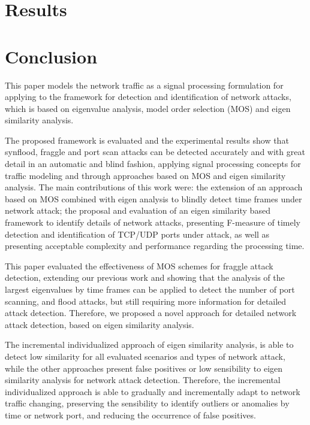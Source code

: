 \section{Results}
\label{sec:4_results}



\section{Conclusion}
\label{sec:4_conclusion}


This paper models the network traffic as a signal processing formulation for applying to the framework for detection and identification of network attacks, which is based on eigenvalue analysis, model order selection (MOS) and eigen similarity analysis.

The proposed framework is evaluated and the experimental results show that synflood, fraggle and port scan attacks can be detected accurately and with great detail in an automatic and blind fashion, applying signal processing concepts for traffic modeling and through approaches based on MOS and eigen similarity analysis. The main contributions of this work were: the extension of an approach based on MOS combined with eigen analysis to blindly detect time frames under network attack; the proposal and evaluation of an eigen similarity based framework to identify details of network attacks, presenting F-measure of timely detection and identification of TCP/UDP ports under attack, as well as presenting acceptable complexity and performance regarding the processing time.

This paper evaluated the effectiveness of MOS schemes for fraggle attack detection, extending our previous work and showing that the analysis of the largest eigenvalues by time frames can be applied to detect the number of port scanning, and flood attacks, but still requiring more information for detailed attack detection. Therefore, we proposed a novel approach for detailed network attack detection, based on eigen similarity analysis.

The incremental individualized approach of eigen similarity analysis, is able to detect low similarity for all evaluated scenarios and types of network attack, while the other approaches present false positives or low sensibility to eigen similarity analysis for network attack detection. Therefore, the incremental individualized approach is able to gradually and incrementally adapt to network traffic changing, preserving the sensibility to identify outliers or anomalies by time or network port, and reducing the occurrence of false positives.

